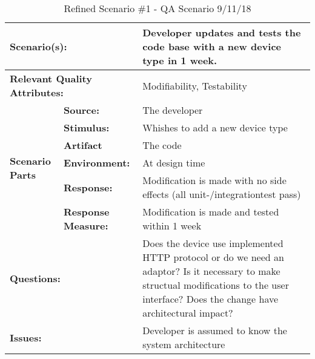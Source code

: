 \documentclass[a4paper,10pt]{article}
\begin{document}
\begin{table}[!htp]
\begin{center}
\begin{tabular}{|p{0.3cm}|p{2.5cm}|p{8cm}|}
  \hline
  \multicolumn{2}{|p{3cm}|}{\bfseries Scenario(s):} & Developer updates and tests the code base with a new device type in 1 week. \\
  \hline
  \multicolumn{2}{|p{3cm}|}{\bfseries Relevant Quality Attributes:} & Modifiability, Testability  \\
  \hline
  \multirow{6}{*}{\begin{sideways}{\bfseries Scenario Parts}\end{sideways}}
  & {\bfseries Source:} & The developer \\
  \cline{2-3}
  & {\bfseries Stimulus:} & Whishes to add a new device type \\
  \cline{2-3}
  & {\bfseries Artifact} & The code \\
  \cline{2-3}
  & {\bfseries Environment:} & At design time \\
  \cline{2-3}
  & {\bfseries Response:} & Modification is made with no side effects (all unit-/integrationtest pass)\\
  \cline{2-3}
  & {\bfseries Response \mbox{Measure:}} & Modification is made and tested within 1 week \\
  \hline
  \multicolumn{2}{|p{3cm}|}{\bfseries Questions:} & Does the device use implemented HTTP protocol or do we need an adaptor? Is it necessary to make structual modifications to the user interface? Does the change have architectural impact? \\
  \hline
  \multicolumn{2}{|p{3cm}|}{\bfseries Issues:} & Developer is assumed to know the system architecture  \\
  \hline
\end{tabular}
\caption{Refined Scenario \#1 - QA Scenario 9/11/18}
\label{scenario1}
\end{center}
\end{table}
\end{document}
